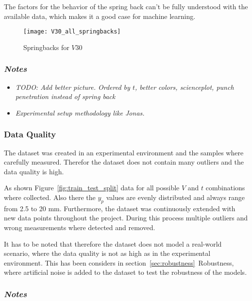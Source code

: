 The factors for the behavior of the spring back can't be fully understood with the available
data, which makes it a
good case for machine learning.

\begin{figure}[htb]
    \begin{tcolorbox}[arc=0pt,boxrule=0.5pt]
        \centering
        \texttt{[image: V30\_all\_springbacks]}
        \caption{Springbacks for $V30$}
        \label{fig:v30_springbacks}
    \end{tcolorbox}
\end{figure}

\subsubsection*{\textit{Notes}}
\begin{itemize}
    \item \textit{TODO: Add better picture. Ordered by $t$, better colors, scienceplot, punch
    penetration instead of spring back}
    \item \textit{Experimental setup methodology like Jonas.}
\end{itemize}

\subsubsection{Data Quality}
The dataset was created in an experimental environment and the samples where carefully measured.
Therefor the dataset does not contain many outliers and the data quality is high.

As shown Figure~\ref{fig:train_test_split} data for all possible $V$ and $t$ combinations where
collected. Also there
the $y_p$ values are evenly distributed and always range from 2.5 to 20 mm.
Furthermore, the dataset was continuously extended with new data points throughout the project.
During this process
multiple outliers and wrong measurements where detected and removed.

It has to be noted that therefore the dataset does not model a real-world scenario, where the
data quality is not as
high as in the experimental environment.
This has been considers in section~\ref{sec:robustness}~Robustness, where artificial noise is
added to the dataset to
test the robustness of the models.

\subsubsection*{\textit{Notes}}

